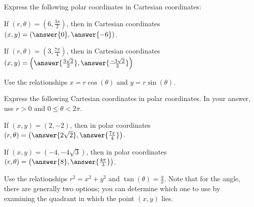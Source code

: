 \documentclass{ximera}
\author{Jim Talamo and Jason Miller}
\begin{document}
\begin{exercise}

Express the following polar coordinates in Cartesian coordinates: 

If $\left(r,\theta\right) = \left( 6, \frac{3\pi}{2}\right)$, then in Cartesian coordinates $(x,y) = \left( \answer{0}, \answer{-6 }\right)$.

If $\left(r,\theta\right) = \left(3, \frac{7 \pi}{4}\right)$, then in Cartesian coordinates $(x,y) = \left( \answer{\frac{3\sqrt{2}}{2}}, \answer{\frac{-3\sqrt{2}}{2}} \right)$

\begin{hint}
Use the relationships $x=r\cos(\theta)$ and $y=r\sin(\theta)$.
\end{hint}

\end{exercise}

\begin{exercise}

Express the following Cartesian coordinates in polar coordinates.  In your answer, use $r>0$ and $0 \leq \theta < 2\pi$. 


If $(x,y) =\left(2, -2 \right)$, then in polar coordinates $(r,\theta) =\left( \answer{ 2\sqrt{2}}, \answer{ \frac{7\pi}{4 } } \right)$. 

If $(x,y) =\left(-4, -4\sqrt{3} \right)$, then in polar coordinates $(r,\theta) =\left( \answer{ 8 } , \answer{  \frac{4\pi}{3}  } \right)$. 

\begin{hint}
Use the relationships $r^2=x^2+y^2$ and $\tan\left(\theta\right) = \frac{y}{x}$.  Note that for the angle, there are generally two options; you can determine which one to use by examining the quadrant in which the point $(x,y)$ lies.

\end{hint}
\end{exercise}
\end{document}
